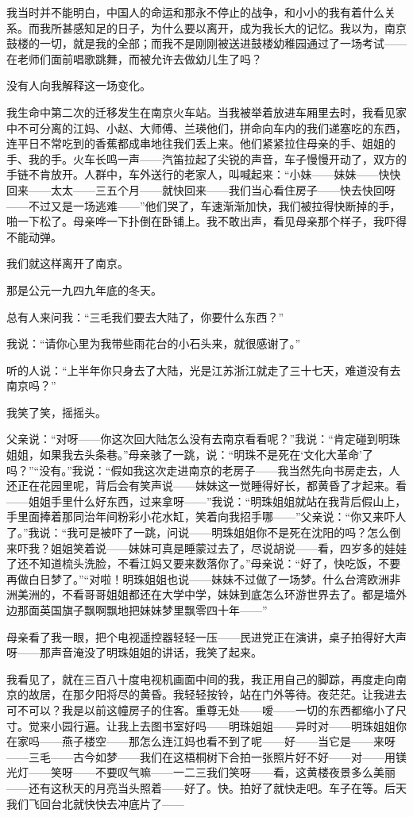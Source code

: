 \par 我当时并不能明白，中国人的命运和那永不停止的战争，和小小的我有着什么关系。而我所甚感知足的日子，为什么要以离开，成为我长大的记忆。我以为，南京鼓楼的一切，就是我的全部；而我不是刚刚被送进鼓楼幼稚园通过了一场考试——在老师们面前唱歌跳舞，而被允许去做幼儿生了吗？
\par 没有人向我解释这一场变化。
\par 我生命中第二次的迁移发生在南京火车站。当我被举着放进车厢里去时，我看见家中不可分离的江妈、小赵、大师傅、兰瑛他们，拼命向车内的我们递塞吃的东西，连平日不常吃到的香蕉都成串地往我们丢上来。他们紧紧拉住母亲的手、姐姐的手、我的手。火车长鸣一声——汽笛拉起了尖锐的声音，车子慢慢开动了，双方的手链不肯放开。人群中，车外送行的老家人，叫喊起来：“小妹——妹妹——快快回来——太太——三五个月——就快回来——我们当心看住房子——快去快回呀——不过又是一场逃难——”他们哭了，车速渐渐加快，我们被拉得快断掉的手，啪一下松了。母亲哗一下扑倒在卧铺上。我不敢出声，看见母亲那个样子，我吓得不能动弹。
\par 我们就这样离开了南京。
\par 那是公元一九四九年底的冬天。
\par 总有人来问我：“三毛我们要去大陆了，你要什么东西？”
\par 我说：“请你心里为我带些雨花台的小石头来，就很感谢了。”
\par 听的人说：“上半年你只身去了大陆，光是江苏浙江就走了三十七天，难道没有去南京吗？”
\par 我笑了笑，摇摇头。
\par 父亲说：“对呀——你这次回大陆怎么没有去南京看看呢？”我说：“肯定碰到明珠姐姐，如果我去头条巷。”母亲骇了一跳，说：“明珠不是死在‘文化大革命’了吗？”“没有。”我说：“假如我这次走进南京的老房子——我当然先向书房走去，人还正在花园里呢，背后会有笑声说——妹妹这一觉睡得好长，都黄昏了才起来。看——姐姐手里什么好东西，过来拿呀——”我说：“明珠姐姐就站在我背后假山上，手里面捧着那同治年间粉彩小花水缸，笑着向我招手哪——”父亲说：“你又来吓人了。”我说：“我可是被吓了一跳，问说——明珠姐姐你不是死在沈阳的吗？怎么倒来吓我？姐姐笑着说——妹妹可真是睡蒙过去了，尽说胡说——看，四岁多的娃娃了还不知道梳头洗脸，不看江妈又要来数落你了。”母亲说：“好了，快吃饭，不要再做白日梦了。”“对啦！明珠姐姐也说——妹妹不过做了一场梦。什么台湾欧洲非洲美洲的，不看哥哥姐姐都还在大学中学，妹妹到底怎么环游世界去了。都是墙外边那面英国旗子飘啊飘地把妹妹梦里飘零四十年——”
\par 母亲看了我一眼，把个电视遥控器轻轻一压——民进党正在演讲，桌子拍得好大声呀——那声音淹没了明珠姐姐的讲话，我笑了起来。
\par 我看见了，就在三百八十度电视机画面中间的我，我正用自己的脚踪，再度走向南京的故居，在那夕阳将尽的黄昏。我轻轻按铃，站在门外等待。夜茫茫。让我进去可不可以？我是以前这幢房子的住客。重尊无处——嗳——一切的东西都缩小了尺寸。觉来小园行遍。让我上去图书室好吗——明珠姐姐——异时对——明珠姐姐你在家吗——燕子楼空——那怎么连江妈也看不到了呢——好——当它是——来呀——三毛——古今如梦——我们在这梧桐树下合拍一张照片好不好——对——用镁光灯——笑呀——不要叹气嘛——一二三我们笑呀——看，这黄楼夜景多么美丽——还有这秋天的月亮当头照着——好了。快。拍好了就快走吧。车子在等。后天我们飞回台北就快快去冲底片了——
